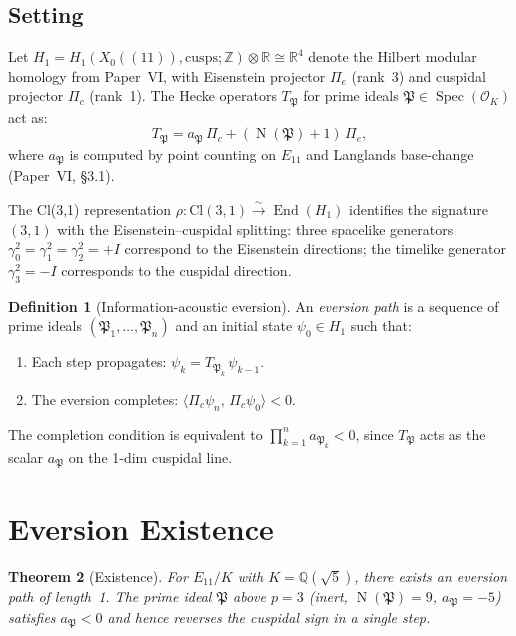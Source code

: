 \documentclass[11pt,a4paper]{article}
\theoremstyle{plain}
\newtheorem{theorem}{Theorem}[section]
\theoremstyle{definition}
\newtheorem{definition}[theorem]{Definition}
\theoremstyle{remark}
\numberwithin{equation}{section}
\providecommand{\Cl}{\mathrm{Cl}}
\providecommand{\ZZ}{\mathbb{Z}}
\providecommand{\QQ}{\mathbb{Q}}
\providecommand{\RR}{\mathbb{R}}
\providecommand{\cO}{\mathcal{O}}
\providecommand{\fP}{\mathfrak{P}}
\DeclareMathOperator{\Spec}{Spec}
\DeclareMathOperator{\End}{End}
\DeclareMathOperator{\Nm}{N}
\begin{document}
\subsection{Setting}

Let $H_1 = H_1(X_0((11)), \mathrm{cusps}; \ZZ) \otimes \RR \cong \RR^4$
denote the Hilbert modular homology from Paper~VI, with Eisenstein projector
$\Pi_e$ (rank~3) and cuspidal projector $\Pi_c$ (rank~1).  The Hecke
operators $T_\fP$ for prime ideals $\fP \in \Spec(\cO_K)$ act as:
\begin{equation}\label{eq:hecke}
  T_\fP = a_\fP\,\Pi_c + (\Nm(\fP)+1)\,\Pi_e,
\end{equation}
where $a_\fP$ is computed by point counting on $E_{11}$ and Langlands
base-change (Paper~VI, \S3.1).

The Cl(3,1) representation $\rho: \Cl(3,1) \xrightarrow{\sim} \End(H_1)$
identifies the signature $(3,1)$ with the Eisenstein--cuspidal splitting:
three spacelike generators $\gamma_0^2 = \gamma_1^2 = \gamma_2^2 = +I$
correspond to the Eisenstein directions; the timelike generator
$\gamma_3^2 = -I$ corresponds to the cuspidal direction.

\begin{definition}[Information-acoustic eversion]
An \emph{eversion path} is a sequence of prime ideals
$(\fP_1, \ldots, \fP_n)$ and an initial state $\psi_0 \in H_1$ such that:
\begin{enumerate}[label=(\roman*)]
\item Each step propagates: $\psi_k = T_{\fP_k}\,\psi_{k-1}$.
\item The eversion completes: $\langle \Pi_c\psi_n,\, \Pi_c\psi_0 \rangle < 0$.
\end{enumerate}
\end{definition}

The completion condition is equivalent to $\prod_{k=1}^n a_{\fP_k} < 0$,
since $T_\fP$ acts as the scalar $a_\fP$ on the 1-dim cuspidal line.


\section{Eversion Existence}\label{sec:existence}

\begin{theorem}[Existence]\label{thm:existence}
For $E_{11}/K$ with $K = \QQ(\sqrt{5})$, there exists an eversion path
of length~1.  The prime ideal $\fP$ above $p = 3$ (inert, $\Nm(\fP) = 9$,
$a_\fP = -5$) satisfies $a_\fP < 0$ and hence reverses the cuspidal sign
in a single step.
\end{theorem}
\end{document}
